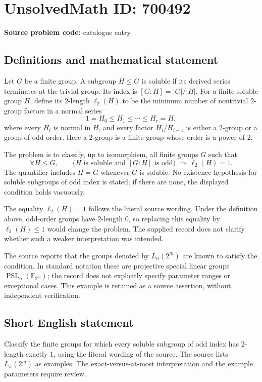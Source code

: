 \documentclass[11pt]{article}
\begin{document}
\section*{UnsolvedMath ID: 700492}
\textbf{Source problem code:} catalogue entry
\subsection{Definitions and mathematical statement}
Let \(G\) be a finite group. A subgroup \(H\leq G\) is soluble if its derived series terminates at the trivial group. Its index is \([G:H]=|G|/|H|\). For a finite soluble group \(H\), define its \(2\)-length \(\ell_2(H)\) to be the minimum number of nontrivial \(2\)-group factors in a normal series
\[
1=H_0\leq H_1\leq\cdots\leq H_r=H,
\]
where every \(H_i\) is normal in \(H\), and every factor \(H_i/H_{i-1}\) is either a \(2\)-group or a group of odd order. Here a \(2\)-group is a finite group whose order is a power of \(2\).

The problem is to classify, up to isomorphism, all finite groups \(G\) such that
\[
\forall H\leq G,\qquad
\bigl(H\text{ is soluble and }[G:H]\text{ is odd}\bigr)
\ \Longrightarrow\ \ell_2(H)=1.
\]
The quantifier includes \(H=G\) whenever \(G\) is soluble. No existence hypothesis for soluble subgroups of odd index is stated; if there are none, the displayed condition holds vacuously.

The equality \(\ell_2(H)=1\) follows the literal source wording. Under the definition above, odd-order groups have \(2\)-length \(0\), so replacing this equality by \(\ell_2(H)\leq1\) would change the problem. The supplied record does not clarify whether such a weaker interpretation was intended.

The source reports that the groups denoted by \(L_n(2^m)\) are known to satisfy the condition. In standard notation these are projective special linear groups \(\operatorname{PSL}_n(\mathbb F_{2^m})\); the record does not explicitly specify parameter ranges or exceptional cases. This example is retained as a source assertion, without independent verification.
\subsection{Short English statement}
Classify the finite groups for which every soluble subgroup of odd index has \(2\)-length exactly \(1\), using the literal wording of the source. The source lists \(L_n(2^m)\) as examples. The exact-versus-at-most interpretation and the example parameters require review.
\end{document}
